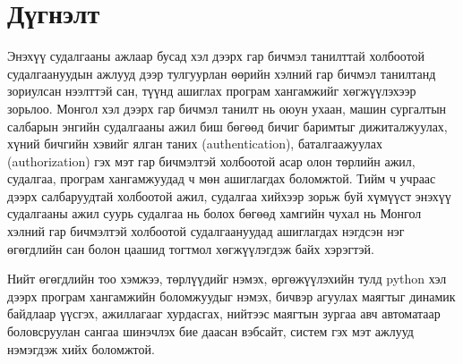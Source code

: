 \chapter{Дүгнэлт}

Энэхүү судалгааны ажлаар бусад хэл дээрх гар бичмэл танилттай холбоотой судалгаануудын ажлууд дээр тулгуурлан өөрийн хэлний гар бичмэл танилтанд зориулсан нээлттэй сан, түүнд ашиглах програм хангамжийг хөгжүүлэхээр зорьлоо. Монгол хэл дээрх гар бичмэл танилт нь оюун ухаан, машин сургалтын салбарын энгийн судалгааны ажил биш бөгөөд бичиг баримтыг дижиталжуулах, хүний бичгийн хэвийг ялган таних (authentication), баталгаажуулах (authorization) гэх мэт гар бичмэлтэй холбоотой асар олон төрлийн ажил, судалгаа, програм хангамжуудад ч мөн ашиглагдах боломжтой. Тийм ч учраас дээрх салбаруудтай холбоотой ажил, судалгаа хийхээр зорьж буй хүмүүст энэхүү судалгааны ажил суурь судалгаа нь болох бөгөөд хамгийн чухал нь Монгол хэлний гар бичмэлтэй холбоотой судалгаануудад ашиглагдах нэгдсэн нэг өгөгдлийн сан болон цаашид тогтмол хөгжүүлэгдэж байх хэрэгтэй.

Нийт өгөгдлийн тоо хэмжээ, төрлүүдийг нэмэх, өргөжүүлэхийн тулд python хэл дээрх програм хангамжийн боломжуудыг нэмэх, бичвэр агуулах маягтыг динамик байдлаар үүсгэх, ажиллагааг хурдасгах, нийтээс маягтын зургаа авч автоматаар боловсруулан сангаа шинэчлэх бие даасан вэбсайт, систем гэх мэт ажлууд нэмэгдэж хийх боломжтой.